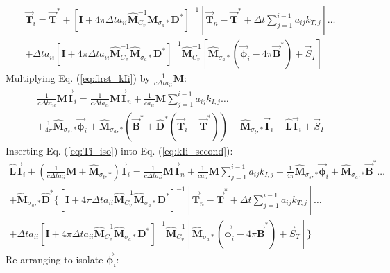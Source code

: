 \documentclass[11pt]{article}
\newcommand{\eqt}[1]{Eq. (\ref{#1})}
\newcommand{\vect}[1]{\ensuremath{ \vec{\mathbf #1}}}
\newcommand{\M}{\ensuremath{ \mathbf M}}
\newcommand{\Mw}{\ensuremath{\widehat{\mathbf M}}}
\begin{document}
%
%
%
\begin{multline}
\vect{T}_i = \vect{T}^*   + \left[\mathbf{I} + 4\pi\Delta t a_{ii}\Mw_{C_v}^{-1}\Mw_{\sigma_a*}\mathbf{D}^*  \right]^{-1}\left[\vect{T}_n -\vect{T}^* + \Delta t \sum_{j=1}^{i-1}{a_{ij} k_{T,j}   }\right] \dots \\
+ \Delta t a_{ii}\left[\mathbf{I} + 4\pi\Delta t a_{ii}\Mw_{C_v}^{-1}\Mw_{\sigma_a*}\mathbf{D}^*  \right]^{-1}\Mw_{C_v}^{-1}
\left[ \Mw_{\sigma_a*}\left(\vect{\phi}_i - 4\pi\vect{B}^*  \right) + \vec{S}_T \right]
\label{eq:Ti_iso}
\end{multline}
%
Multiplying \eqt{eq:first_kIi} by $\frac{1}{c\Delta t a_{ii}}\mathbf{M}$:
\begin{multline}
\frac{1}{c\Delta t a_{ii}}\mathbf{M}\vect{I}_i = \frac{1}{c\Delta t a_{ii}}\mathbf{M}\vect{I}_n + \frac{1}{c a_{ii}} \mathbf{M} \sum_{j=1}^{i-1}{a_{ij} k_{I,j}   } \dots \\
+ 
\frac{1}{4\pi}\widehat{ \mathbf M}_{\sigma_s,*}\vect{\phi}_i + 
\widehat{\mathbf M}_{\sigma_a,*}\left(\vect{B}^* + \widehat{\mathbf D}^*\left(\vect{T}_i -\vect{T}^*  \right)   \right)- \widehat{\mathbf M}_{\sigma_t,*} \vect{I}_i - \widehat{ \mathbf L}\vect{I}_i  + \vec{S}_I
\label{eq:kIi_second}
\end{multline}
%
%
Inserting \eqt{eq:Ti_iso} into \eqt{eq:kIi_second}:
%
%
\begin{multline*}
\widehat{\mathbf L} \vect{I}_i + \left( \frac{1}{c\Delta t a_{ii}}\M + \Mw_{\sigma_t,*} \right) \vect{I}_i = 
\frac{1}{c\Delta t a_{ii}}\M\vect{I}_n + \frac{1}{c a_{ii}} \M \sum_{j=1}^{i-1}{a_{ij} k_{I,j}   } 
+ \frac{1}{4\pi}\Mw_{\sigma_s,*}\vect{\phi}_i 
+ \Mw_{\sigma_a,*}\vect{B}^* \dots \\ 
+ \Mw_{\sigma_a,*} \widehat{\mathbf D}^* \Bigg \{ 
\left[\mathbf{I} + 4\pi \Delta t a_{ii}\Mw_{C_v}^{-1}\Mw_{\sigma_a*}\mathbf{D}^*  \right]^{-1}
\left[\vect{T}_n -\vect{T}^* + \Delta t \sum_{j=1}^{i-1}{a_{ij} k_{T,j}   }\right]  \dots \\
+ \Delta t a_{ii}\left[\mathbf{I} + 4\pi \Delta t a_{ii}\Mw_{C_v}^{-1} \Mw_{\sigma_a*}\mathbf{D}^*  \right]^{-1} 
\Mw_{C_v}^{-1}\left[\Mw_{\sigma_a*} \left(\vect{\phi}_i - 4\pi \vect{B}^*  \right) + \vec{S}_T \right]  \Bigg \}
\end{multline*}
%
%
Re-arranging to isolate $\vect{\phi}_i$:
%
%
\end{document}

